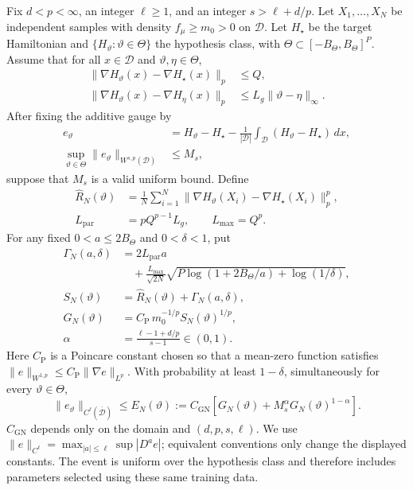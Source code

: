 \begin{theorem}
\label{thm:learning-to-cl}
Fix $d<p<\infty$, an integer $\ell\geq1$, and an integer $s>\ell+d/p$.
Let $X_1,\ldots,X_N$ be independent samples with density
$f_\mu\geq m_0>0$ on $\mathcal D$.
Let $H_\star$ be the target Hamiltonian and
$\{H_\vartheta:\vartheta\in\Theta\}$ the hypothesis class, with
$\Theta\subset[-B_\Theta,B_\Theta]^P$.
Assume that for all $x\in\mathcal D$ and $\vartheta,\eta\in\Theta$,
\begin{align}
 \|\nabla H_\vartheta(x)-\nabla H_\star(x)\|_p&\leq Q,\label{eq:residual-bound}\\
 \|\nabla H_\vartheta(x)-\nabla H_\eta(x)\|_p
   &\leq L_g\|\vartheta-\eta\|_\infty.\label{eq:parameter-bound}
\end{align}
After fixing the additive gauge by
\begin{align}
 e_\vartheta&=H_\vartheta-H_\star-
   \frac{1}{|\mathcal D|}\int_{\mathcal D}(H_\vartheta-H_\star)\,dx,
 \nonumber\\
 \sup_{\vartheta\in\Theta}\|e_\vartheta\|_{W^{s,p}(\mathcal D)}&\leq M_s,
 \label{eq:uniform-sobolev}
\end{align}
suppose that $M_s$ is a valid uniform bound. Define
\begin{align}
 \widehat R_N(\vartheta)
 &=\frac1N\sum_{i=1}^N
    \|\nabla H_\vartheta(X_i)-\nabla H_\star(X_i)\|_p^p,\\
 L_{\mathrm{par}}&=pQ^{p-1}L_g,\qquad L_{\max}=Q^p.
\end{align}
For any fixed $0<a\leq2B_\Theta$ and $0<\delta<1$, put
\begin{align}
 \Gamma_N(a,\delta)
 &=2L_{\mathrm{par}}a\nonumber\\
 &\quad+\frac{L_{\max}}{\sqrt{2N}}
 \sqrt{P\log(1+2B_\Theta/a)+\log(1/\delta)},\\
 S_N(\vartheta)&=\widehat R_N(\vartheta)+\Gamma_N(a,\delta),\\
 G_N(\vartheta)&=C_{\mathrm P}\,m_0^{-1/p}S_N(\vartheta)^{1/p},\\
 \alpha&=\frac{\ell-1+d/p}{s-1}\in(0,1).
\end{align}
Here $C_{\mathrm P}$ is a Poincare constant chosen so that a mean-zero function
satisfies $\|e\|_{W^{1,p}}\leq C_{\mathrm P}\|\nabla e\|_{L^p}$.
With probability at least $1-\delta$, simultaneously for every
$\vartheta\in\Theta$,
\begin{equation}
 \|e_\vartheta\|_{C^\ell(\overline{\mathcal D})}
 \leq E_N(\vartheta):=
 C_{\mathrm{GN}}\left[
 G_N(\vartheta)+M_s^\alpha G_N(\vartheta)^{1-\alpha}\right].
 \label{eq:learning-cl-bound}
\end{equation}
$C_{\mathrm{GN}}$ depends only on the domain and $(d,p,s,\ell)$.
We use $\|e\|_{C^\ell}=\max_{|a|\leq\ell}\sup|D^ae|$;
equivalent conventions only change the displayed constants.
The event is uniform over the hypothesis class and therefore includes parameters
selected using these same training data.
\end{theorem}

